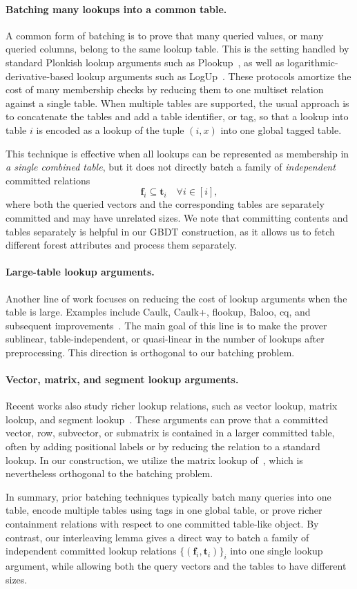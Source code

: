 \paragraph{Batching many lookups into a common table.}
A common form of batching is to prove that many queried values, or many queried
columns, belong to the same lookup table.
This is the setting handled by standard Plonkish lookup arguments such as
Plookup~\cite{plookup20},
as well as logarithmic-derivative-based lookup arguments such as
LogUp~\cite{logup22}.
These protocols amortize the cost of many membership checks by reducing them to
one multiset relation against a single table.
When multiple tables are supported, the usual approach is to concatenate the
tables and add a table identifier, or tag, so that a lookup into table $i$ is
encoded as a lookup of the tuple $(i,x)$ into one global tagged table.

This technique is effective when all lookups can be represented as membership
in \emph{a single combined table}, but it does not directly batch a family of
\emph{independent} committed relations
\[
    \mathbf{f}_i \subseteq \mathbf{t}_i
    \quad \forall i\in [i],
\]
where both the queried vectors and the corresponding tables are separately
committed and may have unrelated sizes.
We note that committing contents and tables separately is
helpful in our GBDT construction, as it allows us to 
fetch different forest attributes and process them separately.

\paragraph{Large-table lookup arguments.}
Another line of work focuses on reducing the cost of lookup arguments when the
table is large.
Examples include Caulk, Caulk+, flookup, Baloo, cq, and subsequent
improvements~\cite{caulk22,caulk+22,flookup22,baloo25,cq22,locq24}.
The main goal of this line is to make the prover sublinear, table-independent, or
quasi-linear in the number of lookups after preprocessing.
This direction is orthogonal to our batching problem.

\paragraph{Vector, matrix, and segment lookup arguments.}
Recent works also study richer lookup relations, such as vector lookup,
matrix lookup, and segment lookup~\cite{cq++24,sublonk24}.
These arguments can prove that a committed vector, row, subvector, or submatrix
is contained in a larger committed table, often by adding positional labels or
by reducing the relation to a standard lookup.
In our construction, we utilize the matrix lookup of~\cite{cq++24},
which is nevertheless orthogonal to the batching problem.

In summary, prior batching techniques typically batch many queries into one
table, encode multiple tables using tags in one global table, or prove richer
containment relations with respect to one committed table-like object.
By contrast, our interleaving lemma gives a direct way to batch a family of
independent committed lookup relations
$\{(\mathbf{f}_i,\mathbf{t}_i)\}_i$ into 
one single lookup argument,
while allowing both the
query vectors and the tables to have different sizes.
